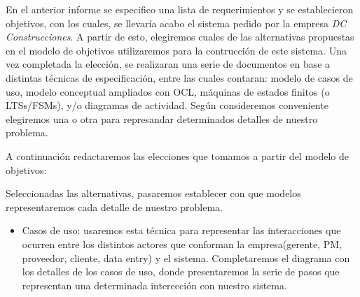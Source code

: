 En el anterior informe se especifico una lista de requerimientos y se establecieron objetivos, con los cuales,
se llevaría acabo el sistema pedido por la empresa \textit{DC Construcciones}. A partir de esto,
elegiremos cuales de las alternativas propuestas en el modelo de objetivos utilizaremos para la
contrucción de este sistema. Una vez completada la elección, se realizaran una serie de documentos
en base a distintas técnicas de especificación, entre las cuales contaran: modelo de casos de uso,
modelo conceptual ampliados con OCL, máquinas de estados finitos (o LTSs/FSMs), y/o diagramas
de actividad. Según consideremos conveniente elegiremos una o otra para represandar determinados
detalles de nuestro problema.

A continuación redactaremos las elecciones que tomamos a partir del modelo de objetivos:

\begin{itemize}

\end{itemize}

Seleccionadas las alternativas, pasaremos establecer con que modelos representaremos cada detalle
 de nuestro problema.

 \begin{itemize}
  \item Casos de uso: usaremos esta técnica para representar las interacciones que ocurren entre los distintos
  actores que conforman la empresa(gerente, PM, proveedor, cliente, data entry) y el sistema. Completaremos
  el diagrama con los detalles de los casos de uso, donde presentaremos la serie de pasos que representan una
  determinada interección con nuestro sistema.
 \end{itemize}
